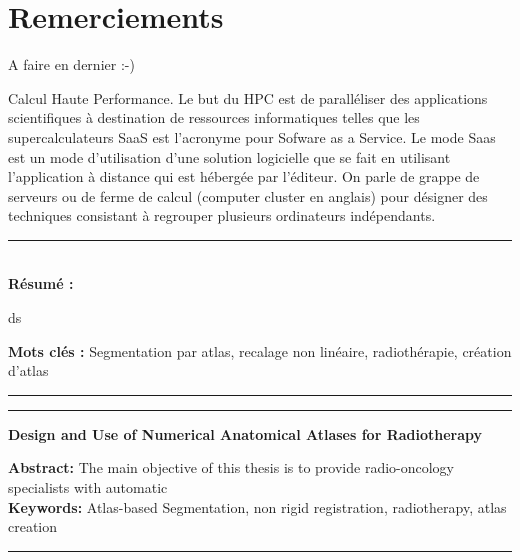 \documentclass[a4paper,11pt,twoside]{StyleThese}
\begin{document}


\dominitoc
{}
\cleardoublepage

\section*{Remerciements}

A faire en dernier :-)

\tableofcontents

\mainmatter

\printnomenclature
{}		{Calcul Haute Performance. Le but du HPC est de paralléliser des applications scientifiques à destination de ressources informatiques telles que les supercalculateurs}
		{SaaS est l'acronyme pour Sofware as a Service. Le mode Saas est un mode d'utilisation d'une solution logicielle que se fait en utilisant l'application à distance qui est hébergée par l'éditeur.}
	{On parle de grappe de serveurs ou de ferme de calcul (computer cluster en anglais) pour désigner des techniques consistant à regrouper plusieurs ordinateurs indépendants.} 




\appendix








\cleardoublepage
\begin{vcenterpage}
\noindent\rule[2pt]{\textwidth}{0.5pt}
\\




{\large\textbf{Résumé :}}

ds


{\large\textbf{Mots clés :}}
Segmentation par atlas, recalage non linéaire, radiothérapie, création d'atlas
\\
\noindent\rule[2pt]{\textwidth}{0.5pt}
\end{vcenterpage}

\begin{vcenterpage}
\noindent\rule[2pt]{\textwidth}{0.5pt}
\begin{center}
{\large\textbf{Design and Use of Numerical Anatomical Atlases for Radiotherapy\\}}
\end{center}
{\large\textbf{Abstract:}}
The main objective of this thesis is to provide radio-oncology specialists with automatic  
\\
{\large\textbf{Keywords:}}
Atlas-based Segmentation, non rigid registration, radiotherapy, atlas creation
\\
\noindent\rule[2pt]{\textwidth}{0.5pt}
\end{vcenterpage}
\end{document}
